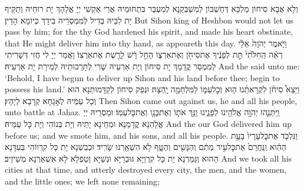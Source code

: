 {וְלָא אֲבָא סִיחוֹן מַלְכָּא דְּחֶשְׁבּוֹן לְמִשְׁבְּקַנָא לְמִעְבַּר בִּתְחוּמֵיהּ אֲרֵי אַקְשִׁי יְיָ אֱלָהָךְ יָת רוּחֵיהּ וְתַקֵּיף יָת לִבֵּיהּ בְּדִיל לְמִמְסְרֵיהּ בִּידָךְ כְּיוֹמָא הָדֵין׃}
{But Sihon king of Heshbon would not let us pass by him; for the \lord\space thy God hardened his spirit, and made his heart obstinate, that He might deliver him into thy hand, as appeareth this day.}{}
\newseder
{}%
{וַיֹּ֤אמֶר יְהֹוָה֙ אֵלַ֔י רְאֵ֗ה הַֽחִלֹּ֙תִי֙ תֵּ֣ת לְפָנֶ֔יךָ אֶת\maqqaf סִיחֹ֖ן וְאֶת\maqqaf אַרְצ֑וֹ הָחֵ֣ל רָ֔שׁ לָרֶ֖שֶׁת אֶת\maqqaf אַרְצֽוֹ׃}
{וַאֲמַר יְיָ לִי חֲזִי דְּשָׁרִיתִי לְמִמְסַר קֳדָמָךְ יָת סִיחוֹן וְיָת אַרְעֵיהּ שָׁרִי לְתָרָכוּתֵיהּ לְמֵירַת יָת אַרְעֵיהּ׃}
{And the \lord\space said unto me: ‘Behold, I have begun to deliver up Sihon and his land before thee; begin to possess his land.’}{}
{וַיֵּצֵא֩ סִיחֹ֨ן לִקְרָאתֵ֜נוּ ה֧וּא וְכׇל\maqqaf עַמּ֛וֹ לַמִּלְחָמָ֖ה יָֽהְצָה׃}
{וּנְפַק סִיחוֹן לְקַדָּמוּתַנָא הוּא וְכָל עַמֵּיהּ לְאָגָחָא קְרָבָא לְיָהָץ׃}
{Then Sihon came out against us, he and all his people, unto battle at Jahaz.}{}
{וַֽיִּתְּנֵ֛הוּ יְהֹוָ֥ה אֱלֹהֵ֖ינוּ לְפָנֵ֑ינוּ וַנַּ֥ךְ אֹת֛וֹ וְאֶת\maqqaf בָּנָ֖ו וְאֶת\maqqaf כׇּל\maqqaf עַמּֽוֹ׃}
{וּמַסְרֵיהּ יְיָ אֱלָהַנָא קֳדָמַנָא וּמְחֵינָא יָתֵיהּ וְיָת בְּנוֹהִי וְיָת כָּל עַמֵּיהּ׃}
{And the \lord\space our God delivered him up before us; and we smote him, and his sons, and all his people.}{}
{וַנִּלְכֹּ֤ד אֶת\maqqaf כׇּל\maqqaf עָרָיו֙ בָּעֵ֣ת הַהִ֔וא וַֽנַּחֲרֵם֙ אֶת\maqqaf כׇּל\maqqaf עִ֣יר מְתִ֔ם וְהַנָּשִׁ֖ים וְהַטָּ֑ף לֹ֥א הִשְׁאַ֖רְנוּ שָׂרִֽיד׃}
{וּכְבַשְׁנָא יָת כָּל קִרְווֹהִי בְּעִדָּנָא הַהוּא וְגַּמַּרְנָא יָת כָּל קִרְוַיָּא גּוּבְרַיָּא וּנְשַׁיָּא וְטַפְלָא לָא אַשְׁאַרְנָא מְשֵׁיזֵיב׃}
{And we took all his cities at that time, and utterly destroyed every city, the men, and the women, and the little ones; we left none remaining;}{}
